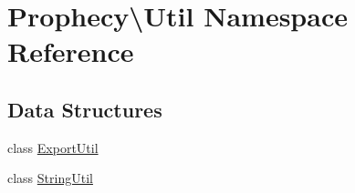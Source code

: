 \hypertarget{namespace_prophecy_1_1_util}{}\section{Prophecy\textbackslash{}Util Namespace Reference}
\label{namespace_prophecy_1_1_util}
\subsection*{Data Structures}
\begin{DoxyCompactItemize}
\item 
class \mbox{\hyperlink{class_prophecy_1_1_util_1_1_export_util}{Export\+Util}}
\item 
class \mbox{\hyperlink{class_prophecy_1_1_util_1_1_string_util}{String\+Util}}
\end{DoxyCompactItemize}
